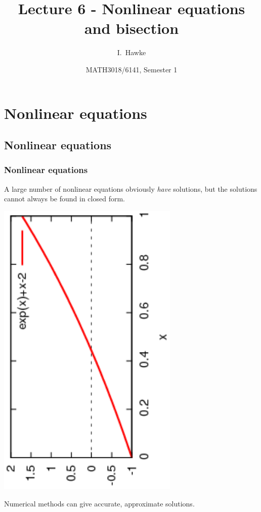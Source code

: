 \documentclass{beamer}
\title[Lecture 6] %
{Lecture 6 - Nonlinear equations and bisection}
\author[I. Hawke] %
{I.~Hawke}
\institute[University of Southampton] %
{
  School of Mathematics, \\
  University of Southampton, UK
}
\date[Semester 1] %
{MATH3018/6141, Semester 1}
\begin{document}
\begin{frame}
  \titlepage
\end{frame}

\section{Nonlinear equations}

\subsection{Nonlinear equations}

\begin{frame}
  \frametitle{Nonlinear equations}

  A large number of nonlinear equations obviously \emph{have}
  solutions, but the solutions cannot always be found in closed form.

  \begin{center}
    \includegraphics[angle=-90,width=0.65\textwidth]{figures/Nonlinear1}
  \end{center} \pause

  Numerical methods %
  can give accurate, approximate solutions.%


\end{frame}
\end{document}
